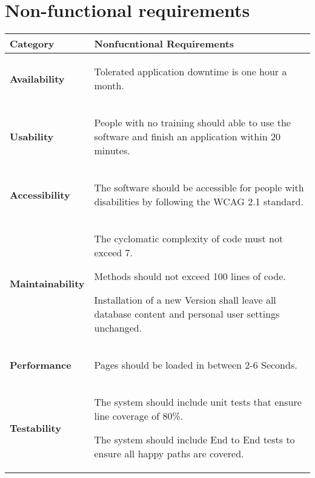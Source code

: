 \newpage
\section{Non-functional requirements}
\label{sec:nfr}
\begin{table}[htb!]
\begin{tabularx}{\textwidth}{l|X}
	\textbf{Category} & \textbf{Nonfucntional Requirements} \\
	\hline
	\textbf{Availability} & 
	    \begin{compactitem}
	        \item Tolerated application downtime is one hour a month.
	    \end{compactitem}\\
	\hline
	\textbf{Usability} &
	    \begin{compactitem}
	        \item People with no training should able to use the software and finish an application within 20 minutes.
	    \end{compactitem}\\
	\hline
	\textbf{Accessibility} & 
	\begin{compactitem}
	    \item The software should be accessible for people with disabilities by following the WCAG 2.1 standard.
	\end{compactitem}\\
	\hline
	\textbf{Maintainability} &
	    \begin{compactitem}
	        \item The cyclomatic complexity of code must not exceed 7.
	        \item Methods should not exceed 100 lines of code.
	        \item Installation of a new Version shall leave all database content and personal user settings unchanged.
	    \end{compactitem}\\
	\hline
	\textbf{Performance} &
	\begin{compactitem}
        \item Pages should be loaded in between 2-6 Seconds.
	\end{compactitem}\\
	\hline
	\textbf{Testability} &
	    \begin{compactitem}
	        \item The system should include unit tests that ensure line coverage of 80\%.
	        \item The system should include End to End tests to ensure all happy paths are covered.

\end{compactitem}
\end{tabularx}
\end{table}

